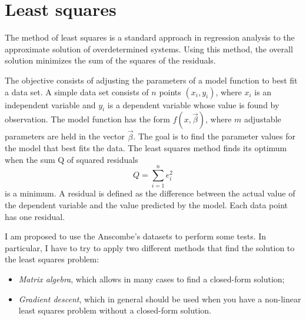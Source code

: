 \section{Least squares}
    The method of least squares is a standard approach in regression analysis to the approximate solution of overdetermined systems. Using this method, the overall solution minimizes the sum of the squares of the residuals.\par
    The objective consists of adjusting the parameters of a model function to best fit a data set. A simple data set consists of \(n\) points \((x_i,y_i)\), where \(x_i\) is an independent variable and \(y_i\) is a dependent variable whose value is found by observation. The model function has the form \(f(x,\vec{\beta})\), where \(m\) adjustable parameters are held in the vector \(\vec{\beta}\). The goal is to find the parameter values for the model that best fits the data. The least squares method finds its optimum when the sum Q of squared residuals
    \[Q = \sum_{i=1}^{n}e_i^2\]
    is a minimum. A residual is defined as the difference between the actual value of the dependent variable and the value predicted by the model. Each data point has one residual.\par
    I am proposed to use the Anscombe's datasets to perform some tests. In particular, I have to try to apply two different methods that find the solution to the least squares problem:
    \begin{itemize}
        \item \emph{Matrix algebra}, which allows in many cases to find a closed-form solution;
        \item \emph{Gradient descent}, which in general should be used when you have a non-linear least squares problem without a closed-form solution.
    \end{itemize}
